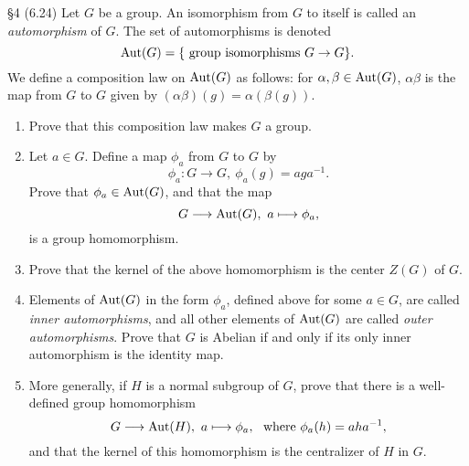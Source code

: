 \documentclass{homework}
\begin{document}
\begin{problem}{\S 4}
  (6.24) Let $G$ be a group. An isomorphism from $G$ to itself is called an \textit{automorphism} of
  $G$. The set of automorphisms is denoted \[
    \operatorname{Aut}(G)=\{ ~\text{group isomorphisms}~ G\to G\}
  .\] We define a composition law on $\operatorname{Aut}(G)$ as follows: for $\alpha,\beta\in \operatorname{Aut}(G)$,
  $\alpha\beta$ is the map from $G$ to $G$ given by $(\alpha\beta)(g)=\alpha(\beta(g))$.
  \begin{enumerate}[label=(\alph*)]
    \item Prove that this composition law makes $G$ a group.
    \item Let $a\in G$. Define a map $\phi_a$ from $G$ to $G$ by \[
        \phi_a:G\longrightarrow G,\ \phi_a(g)=aga^{-1}
      .\] Prove that $\phi_a\in \operatorname{Aut}(G)$, and that the map \[
      G\longrightarrow \operatorname{Aut}(G),\ a\longmapsto \phi_a
      ,\] is a group homomorphism.
    \item Prove that the kernel of the above homomorphism is the center $Z(G)$ of $G$.
    \item Elements of $\operatorname{Aut}(G)$ in the form $\phi_a$, defined above for some $a\in G$, are called
      \textit{inner automorphisms}, and all other elements of $\operatorname{Aut}(G)$ are called \textit{outer
      automorphisms}. Prove that $G$ is Abelian if and only if its only inner automorphism is the
      identity map.
    \item More generally, if $H$ is a normal subgroup of $G$, prove that there is a well-defined
      group homomorphism \[
        G\longrightarrow \Aut(H),\ a\longmapsto \phi_a,\ ~\text{where}~\phi_a(h)=aha^{-1}
      ,\] and that the kernel of this homomorphism is the centralizer of $H$ in $G$.
  \end{enumerate}
\end{problem}
\end{document}
